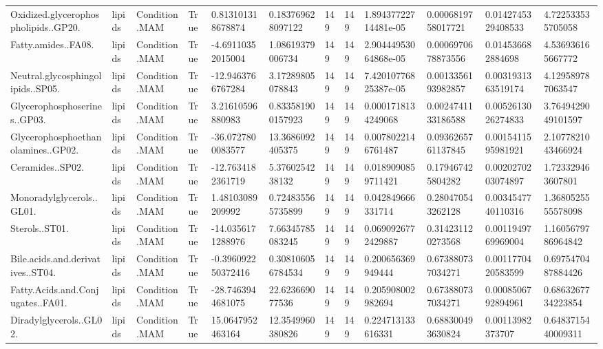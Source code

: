 \begin{longtable}{llllllllllll}
Oxidized.glycerophospholipids..GP20. & lipids & Condition.MAM & True & 0.813101318678874 & 0.183769628097122 & 149 & 149 & 1.89437722714481e-05 & 0.0006819758017721 & 0.0142745329408533 & 4.722533535705058 \\
Fatty.amides..FA08. & lipids & Condition.MAM & True & -4.69110352015004 & 1.08619379006734 & 149 & 149 & 2.90444953064868e-05 & 0.0006970678873556 & 0.014536682884698 & 4.536936165667772 \\
Neutral.glycosphingolipids..SP05. & lipids & Condition.MAM & True & -12.9463766767284 & 3.17289805078843 & 149 & 149 & 7.42010776825387e-05 & 0.0013356193982857 & 0.0031931363519174 & 4.129589787063547 \\
Glycerophosphoserines..GP03. & lipids & Condition.MAM & True & 3.21610596880983 & 0.833581900157923 & 149 & 149 & 0.0001718134249068 & 0.0024741133186588 & 0.0052613026274833 & 3.7649429049101597 \\
Glycerophosphoethanolamines..GP02. & lipids & Condition.MAM & True & -36.0727800083577 & 13.3686092405375 & 149 & 149 & 0.0078022146761487 & 0.0936265761137845 & 0.0015411595981921 & 2.1077821043466924 \\
Ceramides..SP02. & lipids & Condition.MAM & True & -12.7634182361719 & 5.3760254238132 & 149 & 149 & 0.0189090859711421 & 0.179467425804282 & 0.0020270203074897 & 1.723329463607801 \\
Monoradylglycerols..GL01. & lipids & Condition.MAM & True & 1.48103089209992 & 0.724835565735899 & 149 & 149 & 0.042849666331714 & 0.280470543262128 & 0.0034547740110316 & 1.3680525555578098 \\
Sterols..ST01. & lipids & Condition.MAM & True & -14.0356171288976 & 7.66345785083245 & 149 & 149 & 0.0690926772429887 & 0.314231120273568 & 0.0011949769969004 & 1.1605679786964842 \\
Bile.acids.and.derivatives..ST04. & lipids & Condition.MAM & True & -0.396092250372416 & 0.308106056784534 & 149 & 149 & 0.200656369949444 & 0.673880737034271 & 0.0011770420583599 & 0.6975470487884426 \\
Fatty.Acids.and.Conjugates..FA01. & lipids & Condition.MAM & True & -28.7463944681075 & 22.623669077536 & 149 & 149 & 0.205908002982694 & 0.673880737034271 & 0.0008506792894961 & 0.6863267734223854 \\
Diradylglycerols..GL02. & lipids & Condition.MAM & True & 15.0647952463164 & 12.3549960380826 & 149 & 149 & 0.224713133616331 & 0.688300493630824 & 0.00113982373707 & 0.6483715440009311 \\

\end{longtable}
